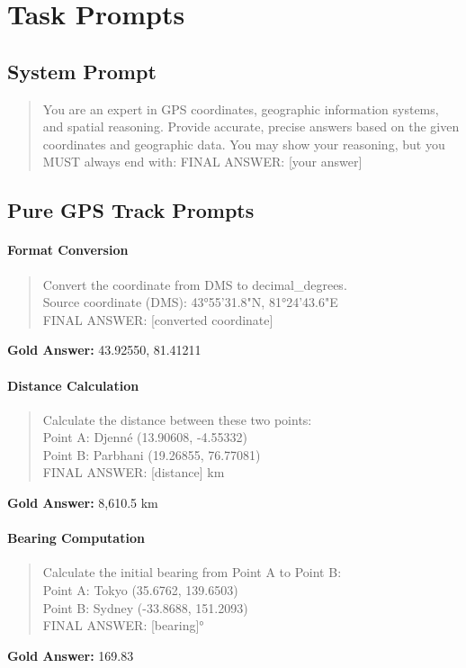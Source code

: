 \section{Task Prompts}
\label{app:task_prompts}

\subsection{System Prompt}
\begin{quote}\ttfamily\small
You are an expert in GPS coordinates, geographic information systems, and spatial reasoning. Provide accurate, precise answers based on the given coordinates and geographic data. You may show your reasoning, but you MUST always end with: FINAL ANSWER: [your answer]
\end{quote}

\subsection{Pure GPS Track Prompts}

\paragraph{Format Conversion}
\begin{quote}\ttfamily\small
Convert the coordinate from DMS to decimal\_degrees.\\
Source coordinate (DMS): 43°55'31.8"N, 81°24'43.6"E\\
FINAL ANSWER: [converted coordinate]
\end{quote}
\textbf{Gold Answer:} 43.92550, 81.41211

\paragraph{Distance Calculation}
\begin{quote}\ttfamily\small
Calculate the distance between these two points:\\
Point A: Djenné (13.90608, -4.55332)\\
Point B: Parbhani (19.26855, 76.77081)\\
FINAL ANSWER: [distance] km
\end{quote}
\textbf{Gold Answer:} 8,610.5 km

\paragraph{Bearing Computation}
\begin{quote}\ttfamily\small
Calculate the initial bearing from Point A to Point B:\\
Point A: Tokyo (35.6762, 139.6503)\\
Point B: Sydney (-33.8688, 151.2093)\\
FINAL ANSWER: [bearing]°
\end{quote}
\textbf{Gold Answer:} 169.83\textdegree

